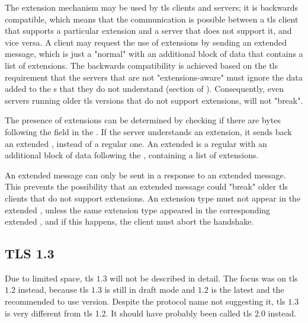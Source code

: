 \documentclass{llncs}
\begin{document}
{The extension mechanism may be used by \gls{tls} clients and servers; it is backwards
compatible, which means that the communication is possible between a \gls{tls} client that supports a particular extension and a server that does not support it,
and vice versa. A client may request the use of extensions by sending an extended 
message, which is just a "normal"  with an additional
block of data that contains a list of extensions. The backwards compatibility is achieved based on the \gls{tls}
requirement that the servers that are not "extensions-aware" must ignore the data
added to the s that they do not understand (section  of \cite{RFC2246}). Consequently,
even servers running older \gls{tls} versions that do not support extensions, will not "break".

The presence of extensions can be determined by checking if there are bytes
following the  field in the .
If the server understands an extension, it sends back an extended ,
instead of a regular one. An extended  is a regular
 with an additional block of data following the
, containing a list of extensions.

An extended  message can only be sent in a response to an
extended  message. This prevents the possibility that an extended
 message could "break" older \gls{tls} clients that do not
support extensions. An extension type must not appear in the
extended , unless the same extension type appeared in the
corresponding extended , and if this happens, the client must abort the handshake.

\subsection{TLS 1.3} \label{tls-13}

Due to limited space, \gls{tls} $1.3$\cite{I-D.ietf-tls-tls13} will not be described in detail. The focus was on \gls{tls} $1.2$ instead, because \gls{tls} $1.3$ is still in draft
mode and $1.2$ is the latest and the recommended to use version.
Despite the protocol name not suggesting it, \gls{tls} $1.3$ is
very different from \gls{tls} 1.2. It should have probably been called
\gls{tls} $2.0$ instead.

}
\end{document}
